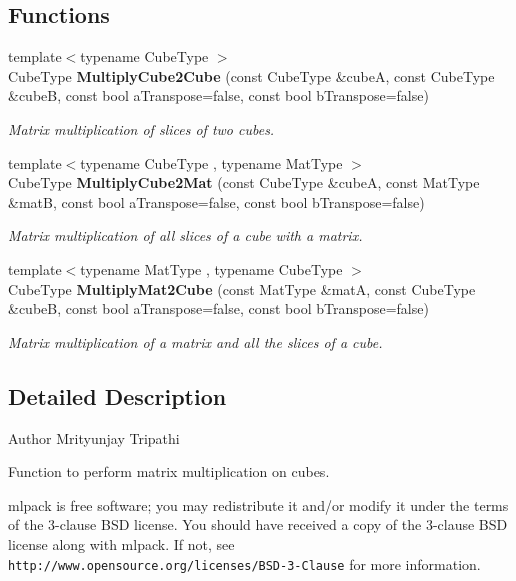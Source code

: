 \subsection*{Functions}
\begin{DoxyCompactItemize}
\item 
{\footnotesize template$<$typename Cube\+Type $>$ }\\Cube\+Type \textbf{ Multiply\+Cube2\+Cube} (const Cube\+Type \&cubeA, const Cube\+Type \&cubeB, const bool a\+Transpose=false, const bool b\+Transpose=false)
\begin{DoxyCompactList}\small\item\em Matrix multiplication of slices of two cubes. \end{DoxyCompactList}\item 
{\footnotesize template$<$typename Cube\+Type , typename Mat\+Type $>$ }\\Cube\+Type \textbf{ Multiply\+Cube2\+Mat} (const Cube\+Type \&cubeA, const Mat\+Type \&matB, const bool a\+Transpose=false, const bool b\+Transpose=false)
\begin{DoxyCompactList}\small\item\em Matrix multiplication of all slices of a cube with a matrix. \end{DoxyCompactList}\item 
{\footnotesize template$<$typename Mat\+Type , typename Cube\+Type $>$ }\\Cube\+Type \textbf{ Multiply\+Mat2\+Cube} (const Mat\+Type \&matA, const Cube\+Type \&cubeB, const bool a\+Transpose=false, const bool b\+Transpose=false)
\begin{DoxyCompactList}\small\item\em Matrix multiplication of a matrix and all the slices of a cube. \end{DoxyCompactList}\end{DoxyCompactItemize}


\subsection{Detailed Description}
\begin{DoxyAuthor}{Author}
Mrityunjay Tripathi
\end{DoxyAuthor}
Function to perform matrix multiplication on cubes.

mlpack is free software; you may redistribute it and/or modify it under the terms of the 3-\/clause B\+SD license. You should have received a copy of the 3-\/clause B\+SD license along with mlpack. If not, see {\tt http\+://www.\+opensource.\+org/licenses/\+B\+S\+D-\/3-\/\+Clause} for more information. 